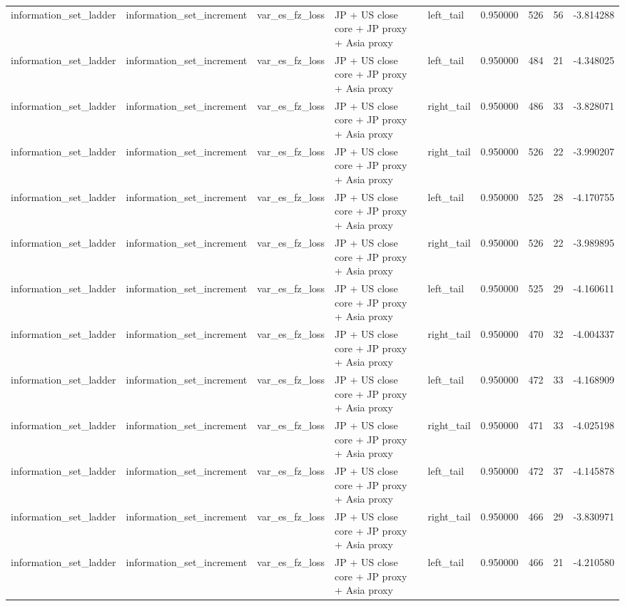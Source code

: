 \begin{tabular}{lllllrrrr}
information\_set\_ladder & information\_set\_increment & var\_es\_fz\_loss & JP + US close core + JP proxy + Asia proxy & left\_tail & 0.950000 & 526 & 56 & -3.814288 \\
information\_set\_ladder & information\_set\_increment & var\_es\_fz\_loss & JP + US close core + JP proxy + Asia proxy & left\_tail & 0.950000 & 484 & 21 & -4.348025 \\
information\_set\_ladder & information\_set\_increment & var\_es\_fz\_loss & JP + US close core + JP proxy + Asia proxy & right\_tail & 0.950000 & 486 & 33 & -3.828071 \\
information\_set\_ladder & information\_set\_increment & var\_es\_fz\_loss & JP + US close core + JP proxy + Asia proxy & right\_tail & 0.950000 & 526 & 22 & -3.990207 \\
information\_set\_ladder & information\_set\_increment & var\_es\_fz\_loss & JP + US close core + JP proxy + Asia proxy & left\_tail & 0.950000 & 525 & 28 & -4.170755 \\
information\_set\_ladder & information\_set\_increment & var\_es\_fz\_loss & JP + US close core + JP proxy + Asia proxy & right\_tail & 0.950000 & 526 & 22 & -3.989895 \\
information\_set\_ladder & information\_set\_increment & var\_es\_fz\_loss & JP + US close core + JP proxy + Asia proxy & left\_tail & 0.950000 & 525 & 29 & -4.160611 \\
information\_set\_ladder & information\_set\_increment & var\_es\_fz\_loss & JP + US close core + JP proxy + Asia proxy & right\_tail & 0.950000 & 470 & 32 & -4.004337 \\
information\_set\_ladder & information\_set\_increment & var\_es\_fz\_loss & JP + US close core + JP proxy + Asia proxy & left\_tail & 0.950000 & 472 & 33 & -4.168909 \\
information\_set\_ladder & information\_set\_increment & var\_es\_fz\_loss & JP + US close core + JP proxy + Asia proxy & right\_tail & 0.950000 & 471 & 33 & -4.025198 \\
information\_set\_ladder & information\_set\_increment & var\_es\_fz\_loss & JP + US close core + JP proxy + Asia proxy & left\_tail & 0.950000 & 472 & 37 & -4.145878 \\
information\_set\_ladder & information\_set\_increment & var\_es\_fz\_loss & JP + US close core + JP proxy + Asia proxy & right\_tail & 0.950000 & 466 & 29 & -3.830971 \\
information\_set\_ladder & information\_set\_increment & var\_es\_fz\_loss & JP + US close core + JP proxy + Asia proxy & left\_tail & 0.950000 & 466 & 21 & -4.210580 \\

\end{tabular}
